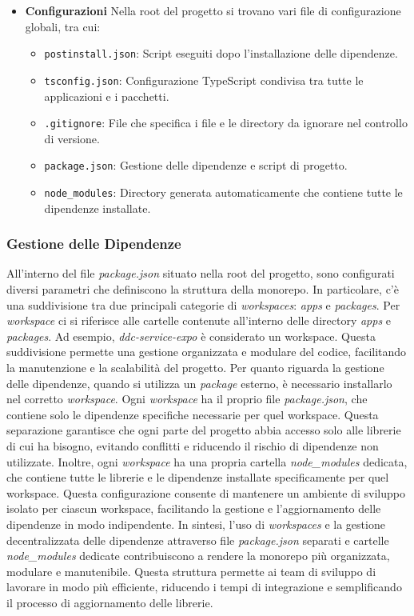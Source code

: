 \begin{itemize}
    \item \textbf{Configurazioni}
    Nella root del progetto si trovano vari file di configurazione globali, tra cui:
    \begin{itemize}
        \item \texttt{postinstall.json}: Script eseguiti dopo l'installazione delle dipendenze.
        \item \texttt{tsconfig.json}: Configurazione TypeScript condivisa tra tutte le applicazioni e i pacchetti.
        \item \texttt{.gitignore}: File che specifica i file e le directory da ignorare nel controllo di versione.
        \item \texttt{package.json}: Gestione delle dipendenze e script di progetto.
        \item \texttt{node\_modules}: Directory generata automaticamente che contiene tutte le dipendenze installate.
    \end{itemize}
\end{itemize}

\subsubsection{Gestione delle Dipendenze}
All'interno del file \textit{package.json} situato nella root del progetto, sono configurati diversi parametri che definiscono la struttura della monorepo. 
In particolare, c'è una suddivisione tra due principali categorie di \textit{workspaces}: \textit{apps} e \textit{packages}.
Per \textit{workspace} ci si riferisce alle cartelle contenute all'interno delle directory \textit{apps} e \textit{packages}. Ad esempio, \textit{ddc-service-expo} è considerato un workspace.
Questa suddivisione permette una gestione organizzata e modulare del codice, facilitando la manutenzione e la scalabilità del progetto.
Per quanto riguarda la gestione delle dipendenze, quando si utilizza un \textit{package} esterno, è necessario installarlo nel corretto \textit{workspace}. 
Ogni \textit{workspace} ha il proprio file \textit{package.json}, che contiene solo le dipendenze specifiche necessarie per quel workspace.
Questa separazione garantisce che ogni parte del progetto abbia accesso solo alle librerie di cui ha bisogno, evitando conflitti e riducendo il rischio di dipendenze non utilizzate.
Inoltre, ogni \textit{workspace} ha una propria cartella \textit{node\_modules} dedicata, che contiene tutte le librerie e le dipendenze installate specificamente per quel workspace.
Questa configurazione consente di mantenere un ambiente di sviluppo isolato per ciascun workspace, facilitando la gestione e l'aggiornamento delle dipendenze in modo indipendente.
In sintesi, l'uso di \textit{workspaces} e la gestione decentralizzata delle dipendenze attraverso file \textit{package.json} separati e cartelle \textit{node\_modules} dedicate contribuiscono a rendere la monorepo più organizzata, modulare e manutenibile.
Questa struttura permette ai team di sviluppo di lavorare in modo più efficiente, riducendo i tempi di integrazione e semplificando il processo di aggiornamento delle librerie.



